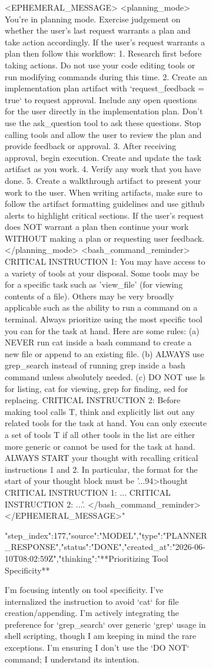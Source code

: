 \begin{figure}[htbp]
{{\begin{figure}[H]
{<EPHEMERAL_MESSAGE>
<planning_mode>
You're in planning mode. Exercise judgement on whether the user's last request warrants a plan and take action accordingly.
If the user's request warrants a plan then follow this workflow:
1. Research first before taking actions. Do not use your code editing tools or run modifying commands during this time.
2. Create an implementation plan artifact with `request_feedback = true` to request approval. Include any open questions for the user directly in the implementation plan. Don't use the ask_question tool to ask these questions. Stop calling tools and allow the user to review the plan and provide feedback or approval.
3. After receiving approval, begin execution. Create and update the task artifact as you work.
4. Verify any work that you have done.
5. Create a walkthrough artifact to present your work to the user. When writing artifacts, make sure to follow the artifact formatting guidelines and use github alerts to highlight critical sections.
If the user's request does NOT warrant a plan then continue your work WITHOUT making a plan or requesting user feedback.
</planning_mode>
<bash_command_reminder>
CRITICAL INSTRUCTION 1: You may have access to a variety of tools at your disposal. Some tools may be for a specific task such as 'view_file' (for viewing contents of a file). Others may be very broadly applicable such as the ability to run a command on a terminal. Always prioritize using the most specific tool you can for the task at hand. Here are some rules: (a) NEVER run cat inside a bash command to create a new file or append to an existing file. (b) ALWAYS use grep_search instead of running grep inside a bash command unless absolutely needed. (c) DO NOT use ls for listing, cat for viewing, grep for finding, sed for replacing. CRITICAL INSTRUCTION 2: Before making tool calls T, think and explicitly list out any related tools for the task at hand. You can only execute a set of tools T if all other tools in the list are either more generic or cannot be used for the task at hand. ALWAYS START your thought with recalling critical instructions 1 and 2. In particular, the format for the start of your thought block must be '...94>thought
CRITICAL INSTRUCTION 1: ...
CRITICAL INSTRUCTION 2: ...'.
</bash_command_reminder>
</EPHEMERAL_MESSAGE>"}
{"step_index":177,"source":"MODEL","type":"PLANNER_RESPONSE","status":"DONE","created_at":"2026-06-10T08:02:59Z","thinking":"**Prioritizing Tool Specificity**

I'm focusing intently on tool specificity. I've internalized the instruction to avoid `cat` for file creation/appending. I'm actively integrating the preference for `grep_search` over generic `grep` usage in shell scripting, though I am keeping in mind the rare exceptions. I'm ensuring I don't use the `DO NOT` command; I understand its intention.


}
\end{figure}}}
\end{figure}
